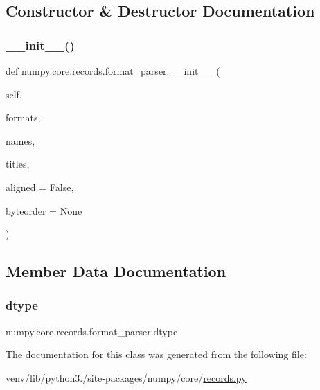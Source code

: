 \subsection{Constructor \& Destructor Documentation}
\mbox{\label{classnumpy_1_1core_1_1records_1_1format__parser_a6dde6659fb3b6d8aecd64b4135be9a99}} 
\subsubsection{\texorpdfstring{\+\_\+\+\_\+init\+\_\+\+\_\+()}{\_\_init\_\_()}}
{\footnotesize\ttfamily def numpy.\+core.\+records.\+format\+\_\+parser.\+\_\+\+\_\+init\+\_\+\+\_\+ (\begin{DoxyParamCaption}\item[{}]{self,  }\item[{}]{formats,  }\item[{}]{names,  }\item[{}]{titles,  }\item[{}]{aligned = {\ttfamily False},  }\item[{}]{byteorder = {\ttfamily None} }\end{DoxyParamCaption})}



\subsection{Member Data Documentation}
\mbox{\label{classnumpy_1_1core_1_1records_1_1format__parser_a58c32390714015baad90c06ebec15af4}} 
\subsubsection{\texorpdfstring{dtype}{dtype}}
{\footnotesize\ttfamily numpy.\+core.\+records.\+format\+\_\+parser.\+dtype}



The documentation for this class was generated from the following file\+:\begin{DoxyCompactItemize}
\item 
venv/lib/python3./site-\/packages/numpy/core/\hyperlink{records_8py}{records.\+py}\end{DoxyCompactItemize}
